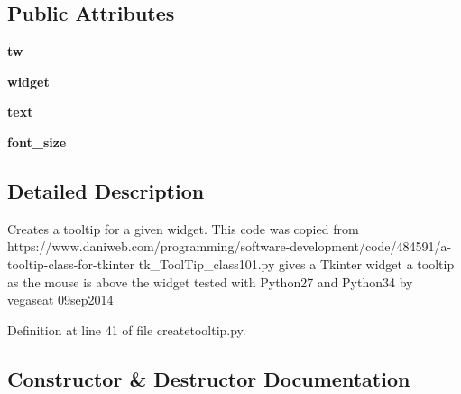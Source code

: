 \subsection*{Public Attributes}
\begin{DoxyCompactItemize}
\item 
{\bfseries tw}\hypertarget{classnegui_1_1createtooltip_1_1CreateToolTip_ac47a0f82a5a354f6c8914c4631d1a0cf}{}\label{classnegui_1_1createtooltip_1_1CreateToolTip_ac47a0f82a5a354f6c8914c4631d1a0cf}

\item 
{\bfseries widget}\hypertarget{classnegui_1_1createtooltip_1_1CreateToolTip_a6619448e568b135261fd02a6d9b36725}{}\label{classnegui_1_1createtooltip_1_1CreateToolTip_a6619448e568b135261fd02a6d9b36725}

\item 
{\bfseries text}\hypertarget{classnegui_1_1createtooltip_1_1CreateToolTip_a198b3395803def62ec55ed820e756b11}{}\label{classnegui_1_1createtooltip_1_1CreateToolTip_a198b3395803def62ec55ed820e756b11}

\item 
{\bfseries font\+\_\+size}\hypertarget{classnegui_1_1createtooltip_1_1CreateToolTip_a42f2306cb6ad9995d76e0eb556416bed}{}\label{classnegui_1_1createtooltip_1_1CreateToolTip_a42f2306cb6ad9995d76e0eb556416bed}

\end{DoxyCompactItemize}


\subsection{Detailed Description}
\begin{DoxyVerb}Creates a tooltip for a given widget.
This code was copied from 
https://www.daniweb.com/programming/software-development/code/484591/a-tooltip-class-for-tkinter
tk_ToolTip_class101.py
gives a Tkinter widget a tooltip as the mouse is above the widget
tested with Python27 and Python34  by  vegaseat  09sep2014\end{DoxyVerb}
 

Definition at line 41 of file createtooltip.\+py.



\subsection{Constructor \& Destructor Documentation}
